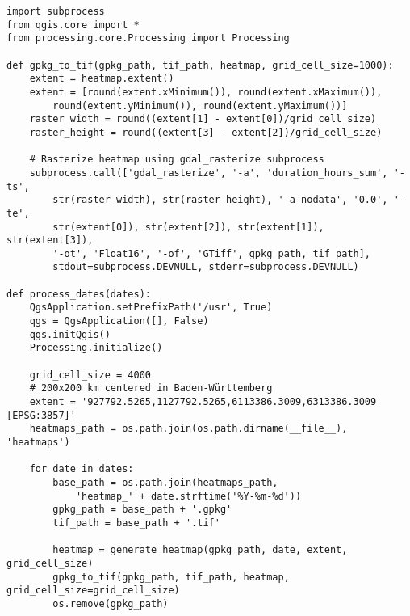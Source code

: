 \clearpage
\begin{code}
\begin{verbatim}
import subprocess
from qgis.core import *
from processing.core.Processing import Processing

def gpkg_to_tif(gpkg_path, tif_path, heatmap, grid_cell_size=1000):
    extent = heatmap.extent()
    extent = [round(extent.xMinimum()), round(extent.xMaximum()),
        round(extent.yMinimum()), round(extent.yMaximum())]
    raster_width = round((extent[1] - extent[0])/grid_cell_size)
    raster_height = round((extent[3] - extent[2])/grid_cell_size)

    # Rasterize heatmap using gdal_rasterize subprocess
    subprocess.call(['gdal_rasterize', '-a', 'duration_hours_sum', '-ts',
        str(raster_width), str(raster_height), '-a_nodata', '0.0', '-te',
        str(extent[0]), str(extent[2]), str(extent[1]), str(extent[3]),
        '-ot', 'Float16', '-of', 'GTiff', gpkg_path, tif_path],
        stdout=subprocess.DEVNULL, stderr=subprocess.DEVNULL)

def process_dates(dates):
    QgsApplication.setPrefixPath('/usr', True)
    qgs = QgsApplication([], False)
    qgs.initQgis()
    Processing.initialize()

    grid_cell_size = 4000
    # 200x200 km centered in Baden-Württemberg
    extent = '927792.5265,1127792.5265,6113386.3009,6313386.3009 [EPSG:3857]'
    heatmaps_path = os.path.join(os.path.dirname(__file__), 'heatmaps')

    for date in dates:
        base_path = os.path.join(heatmaps_path,
            'heatmap_' + date.strftime('%Y-%m-%d'))
        gpkg_path = base_path + '.gpkg'
        tif_path = base_path + '.tif'

        heatmap = generate_heatmap(gpkg_path, date, extent, grid_cell_size)
        gpkg_to_tif(gpkg_path, tif_path, heatmap, grid_cell_size=grid_cell_size)
        os.remove(gpkg_path)
\end{verbatim}
\label{lst:ProcessDatesFunction}
\end{code}

